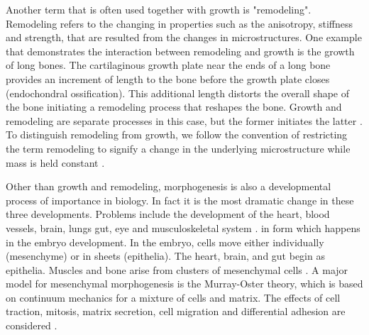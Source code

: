 Another term that is often used together with growth is "remodeling". Remodeling refers to the changing in properties such as the anisotropy, stiffness and strength, that are resulted from the changes in microstructures. One example that demonstrates the interaction between remodeling and growth is the growth of long bones. The cartilaginous growth plate near the ends of a long bone provides an increment of length to the bone before the growth plate closes (endochondral ossification). This additional length distorts the overall shape of the bone initiating a remodeling process that reshapes the bone. Growth and remodeling are separate processes in this case, but the former initiates the latter \cite{Ambrosi}. To distinguish remodeling from growth, we follow the convention of restricting the term remodeling to signify a change in the underlying microstructure while mass is held constant \cite{Kuhl4, Garikipati3}.

Other than growth and remodeling, morphogenesis is  also a developmental process of importance in biology. In fact it is the most dramatic change in these three developments. Problems include the development of the heart, blood vessels, brain, lungs gut, eye and musculoskeletal system \cite{Murray}. in form which happens in the embryo development. In the embryo, cells move either individually (mesenchyme) or in sheets (epithelia). The heart, brain, and gut begin as epithelia. Muscles and bone arise from clusters of mesenchymal cells \cite{Ambrosi}. A major model for mesenchymal morphogenesis is the Murray-Oster theory, which is based on continuum mechanics for a mixture of cells and matrix. The effects of cell traction, mitosis, matrix secretion, cell migration and differential adhesion are considered \cite{Murray2, Oster}.

